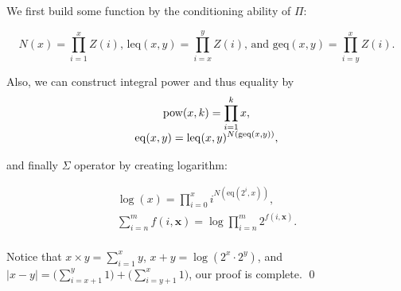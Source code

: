 
\begin{pf} \rm
  We first build some function by the conditioning ability of $\Pi$:

\[
  N(x) = \prod_{i=1}^{x} Z(i)\textrm{, }
  \mathrm{leq}(x, y) = \prod_{i = x}^y Z(i)\textrm{, and }
  \mathrm{geq}(x, y) = \prod_{i = y}^x Z(i).
\]

\noindent Also, we can construct integral power and thus equality by
\[
 \begin{array}{c}
    \displaystyle \mathrm{pow}(x, k)  = \prod_{i = 1}^{k} x, \\
    \displaystyle \mathrm{eq}(x, y) = \mathrm{leq}(x, y) ^ {N( \mathrm{geq}(x, y))}, \\
 \end{array}
\]

\noindent and finally $\Sigma$ operator by creating logarithm:

\[
 \begin{array}{c}
    \displaystyle \log (x) = \prod_{i = 0}^{x} i^{N(\mathrm{eq}(2^i, x))}, \\
    \displaystyle \sum_{i=n}^{m} f(i, \mathbf{x}) = \log \prod_{i=n}^{m} 2^{f(i, \mathbf{x})}. \\
 \end{array}
\]

\noindent Notice that
$\displaystyle x\times y = \sum_{i=1}^x y$,
$x + y = \log(2^x\cdot 2^y)$, and
$\displaystyle |x-y| = \Big( \sum_{i=x+1}^y 1 \Big) + \Big( \sum_{i=y+1}^x 1 \Big)$,
our proof is complete. \qed
\end{pf}


